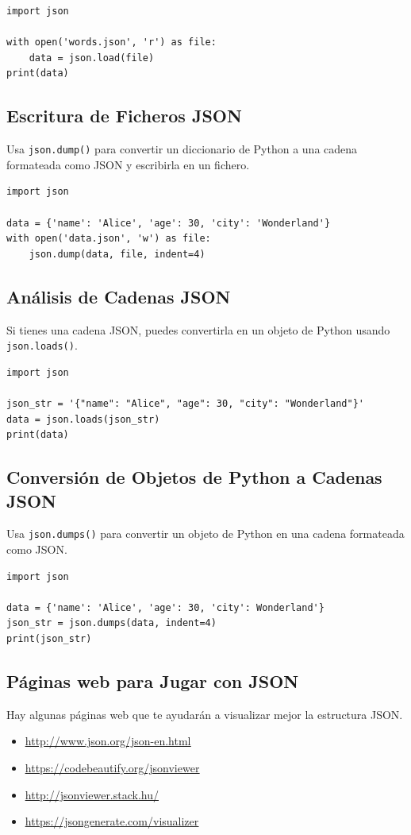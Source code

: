 \documentclass[10pt,a4paper]{article}
\begin{document}
\begin{lstlisting}
import json

with open('words.json', 'r') as file:
    data = json.load(file)
print(data)
\end{lstlisting}

\subsection{Escritura de Ficheros JSON}
Usa \lstinline|json.dump()| para convertir un diccionario de Python a una cadena formateada como JSON y escribirla en un fichero.

\begin{lstlisting}
import json

data = {'name': 'Alice', 'age': 30, 'city': 'Wonderland'}
with open('data.json', 'w') as file:
    json.dump(data, file, indent=4)
\end{lstlisting}

\subsection{Análisis de Cadenas JSON}
Si tienes una cadena JSON, puedes convertirla en un objeto de Python usando \lstinline|json.loads()|.

\begin{lstlisting}
import json

json_str = '{"name": "Alice", "age": 30, "city": "Wonderland"}'
data = json.loads(json_str)
print(data)
\end{lstlisting}

\subsection{Conversión de Objetos de Python a Cadenas JSON}
Usa \lstinline|json.dumps()| para convertir un objeto de Python en una cadena formateada como JSON.

\begin{lstlisting}
import json

data = {'name': 'Alice', 'age': 30, 'city': Wonderland'}
json_str = json.dumps(data, indent=4)
print(json_str)
\end{lstlisting}

\subsection{Páginas web para Jugar con JSON}
Hay algunas páginas web que te ayudarán a visualizar mejor la estructura JSON.

\begin{itemize}
\setlength\itemsep{0.4cm}
\item \href{http://www.json.org/json-en.html}{\color{blue}\underline{http://www.json.org/json-en.html}}
\item \href{https://codebeautify.org/jsonviewer}{\color{blue}\underline{https://codebeautify.org/jsonviewer}}
\item \href{http://jsonviewer.stack.hu/}{\color{blue}\underline{http://jsonviewer.stack.hu/}}
\item \href{https://jsongenerate.com/visualizer}{\color{blue}\underline{https://jsongenerate.com/visualizer}}
\end{itemize}
\end{document}
